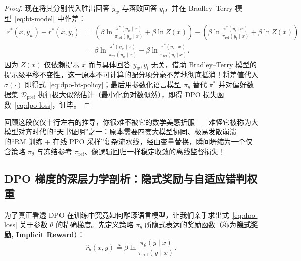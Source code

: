 \begin{thmBox}
\begin{proof}
现在将其分别代入胜出回答 $y_w$ 与落败回答 $y_l$，并在 Bradley--Terry 模型~\eqref{eq:bt-model} 中作差：
\begin{align*}
  r^*(x, y_w) - r^*(x, y_l)
  &= \left(\beta \ln \frac{\pi^*(y_w \mid x)}{\pi_{\mathrm{ref}}(y_w \mid x)} + \beta \ln Z(x)\right)
   - \left(\beta \ln \frac{\pi^*(y_l \mid x)}{\pi_{\mathrm{ref}}(y_l \mid x)} + \beta \ln Z(x)\right) \\
  &= \beta \ln \frac{\pi^*(y_w \mid x)}{\pi_{\mathrm{ref}}(y_w \mid x)} - \beta \ln \frac{\pi^*(y_l \mid x)}{\pi_{\mathrm{ref}}(y_l \mid x)}.
\end{align*}
因为 $Z(x)$ 仅依赖提示 $x$ 而与具体回答 $y_w, y_l$ 无关，借助 Bradley--Terry 模型的提示级平移不变性，这一原本不可计算的配分项分毫不差地彻底抵消！将差值代入 $\sigma(\cdot)$ 即得式~\eqref{eq:dpo-bt-policy}；最后用参数化语言模型 $\pi_\theta$ 替代 $\pi^*$ 并对偏好数据集 $\mathcal{D}_{\mathrm{pref}}$ 执行极大似然估计（最小化负对数似然），即得 DPO 损失函数~\eqref{eq:dpo-loss}，证毕。
\end{proof}
\end{thmBox}

回顾这段仅仅十行左右的推导，你很难不被它的数学美感折服——难怪它被称为大模型对齐时代的“天书证明”之一：原本需要四套大模型协同、极易发散崩溃的“RM 训练 $+$ 在线 PPO 采样”复杂流水线，经由变量替换，瞬间坍缩为一个仅含策略 $\pi_\theta$ 与冻结参考 $\pi_{\mathrm{ref}}$、像逻辑回归一样稳定收敛的离线监督损失！

\subsection{DPO 梯度的深层力学剖析：隐式奖励与自适应错判权重}

为了真正看透 DPO 在训练中究竟如何雕琢语言模型，让我们亲手求出式~\eqref{eq:dpo-loss} 关于参数 $\theta$ 的精确梯度。先定义策略 $\pi_\theta$ 所隐式表达的奖励函数（称为\textbf{隐式奖励, Implicit Reward}）：
\begin{equation}
  \hat{r}_\theta(x, y) \triangleq \beta \ln \frac{\pi_\theta(y \mid x)}{\pi_{\mathrm{ref}}(y \mid x)}.
  \label{eq:implicit-reward}
\end{equation}

